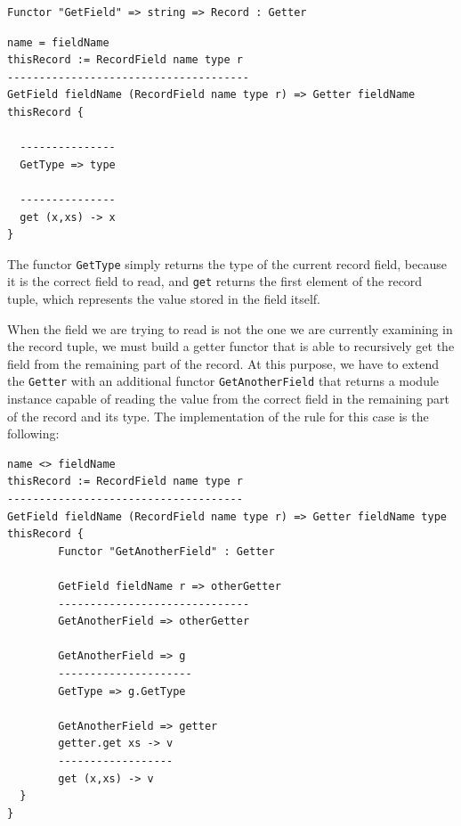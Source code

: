 \begin{lstlisting}
Functor "GetField" => string => Record : Getter
\end{lstlisting}

\begin{lstlisting}[caption = Getting a field (case 1),label = lst:ch_functors_getter1]
name = fieldName
thisRecord := RecordField name type r
--------------------------------------
GetField fieldName (RecordField name type r) => Getter fieldName thisRecord {
  
  ---------------
  GetType => type
  
  ---------------
  get (x,xs) -> x
}
\end{lstlisting}

\noindent
The functor \texttt{GetType} simply returns the type of the current record field, because it is the correct field to read, and \texttt{get} returns the first element of the record tuple, which represents the value stored in the field itself.

When the field we are trying to read is not the one we are currently examining in the record tuple, we must build a getter functor that is able to recursively get the field from the remaining part of the record. At this purpose, we have to extend the \texttt{Getter} with an additional functor \texttt{GetAnotherField} that returns a module instance capable of reading the value from the correct field in the remaining part of the record and its type. The implementation of the rule for this case is the following:

\begin{lstlisting}[caption = Getting a field (case 2),label = lst:ch_functors_getter2]
name <> fieldName
thisRecord := RecordField name type r
-------------------------------------
GetField fieldName (RecordField name type r) => Getter fieldName type thisRecord {
		Functor "GetAnotherField" : Getter
		
		GetField fieldName r => otherGetter
		------------------------------
		GetAnotherField => otherGetter
		
		GetAnotherField => g
		---------------------
		GetType => g.GetType
		
		GetAnotherField => getter
		getter.get xs -> v
		------------------
		get (x,xs) -> v
  }
}
\end{lstlisting}

